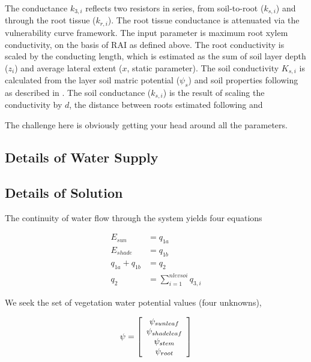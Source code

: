 \documentclass[draft,linenumbers]{agujournal}
\begin{document}
The conductance $k_{3,i}$ reflects two resistors in series, from soil-to-root ($k_{s,i}$) and through the
root tissue ($k_{r,i}$).
The root tissue conductance is attenuated via the vulnerability curve framework. 
The input parameter is maximum root xylem conductivity, on the basis of RAI as defined above.
The root conductivity is scaled by the conducting length, which is estimated as the sum of soil layer depth ($z_i$)
and average lateral extent ($x$, static parameter).
The soil conductivity $K_{s,i}$ is calculated from the layer soil matric potential ($\psi_s$) 
and soil properties following \citet{clapp1978} as described in \citet{oleson2013}.
The soil conductance ($k_{s,i}$) is the result of scaling the conductivity by $d$, 
 the distance between roots estimated following \citet{williams1996} and \citet{bonan2014}

The challenge here is obviously getting your head around all the parameters.

\subsection{Details of Water Supply}

\subsection{Details of Solution}


The continuity of water flow through the system yields four equations
   \begin{linenomath*} \begin{equation}
   \begin{aligned}
   E_{sun}&=q_{1a}\\
   E_{shade}&=q_{1b}\\
   q_{1a}+q_{1b}&=q_2\\
   q_2&=\sum_{i=1}^{nlevsoi}{q_{3,i}}
   \end{aligned}
   \end{equation} \end{linenomath*}

We seek the set of vegetation water potential values (four unknowns), 

   \begin{linenomath*} \begin{equation}
   \psi=\left[ \begin {array}{c} 
   \psi_{sunleaf}\cr\psi_{shadeleaf}\cr\psi_{stem}\cr\psi_{root}
   \end {array} \right] 
   \end{equation} \end{linenomath*}
\end{document}
